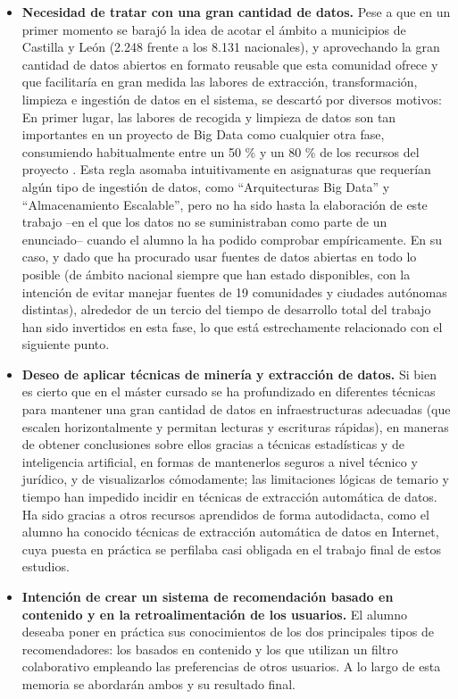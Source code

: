 \begin{itemize}
    \item \textbf{Necesidad de tratar con una gran cantidad de datos.} Pese a que en un primer momento se barajó la idea de acotar el ámbito a municipios de Castilla y León (2.248 frente a los 8.131 nacionales), y aprovechando la gran cantidad de datos abiertos en formato reusable que esta comunidad ofrece y que facilitaría en gran medida las labores de extracción, transformación, limpieza e ingestión de datos en el sistema, se descartó por diversos motivos: En primer lugar, las labores de recogida y limpieza de datos son tan importantes en un proyecto de Big Data como cualquier otra fase, consumiendo habitualmente entre un 50 \% y un 80 \% de los recursos del proyecto \cite{data_prep}. Esta regla asomaba intuitivamente en asignaturas que requerían algún tipo de ingestión de datos, como ``Arquitecturas Big Data'' y ``Almacenamiento Escalable'', pero no ha sido hasta la elaboración de este trabajo –en el que los datos no se suministraban como parte de un enunciado– cuando el alumno la ha podido comprobar empíricamente. En su caso, y dado que ha procurado usar fuentes de datos abiertas en todo lo posible (de ámbito nacional siempre que han estado disponibles, con la intención de evitar manejar fuentes de 19 comunidades y ciudades autónomas distintas), alrededor de un tercio del tiempo de desarrollo total del trabajo han sido invertidos en esta fase, lo que está estrechamente relacionado con el siguiente punto.
    \item \textbf{Deseo de aplicar técnicas de minería y extracción de datos.} Si bien es cierto que en el máster cursado se ha profundizado en diferentes técnicas para mantener una gran cantidad de datos en infraestructuras adecuadas (que escalen horizontalmente y permitan lecturas y escrituras rápidas), en maneras de obtener conclusiones sobre ellos gracias a técnicas estadísticas y de inteligencia artificial, en formas de mantenerlos seguros a nivel técnico y jurídico, y de visualizarlos cómodamente; las limitaciones lógicas de temario y tiempo han impedido incidir en técnicas de extracción automática de datos. Ha sido gracias a otros recursos aprendidos de forma autodidacta, como el alumno ha conocido técnicas de extracción automática de datos en Internet, cuya puesta en práctica se perfilaba casi obligada en el trabajo final de estos estudios.
    \item \textbf{Intención de crear un sistema de recomendación basado en contenido y en la retroalimentación de los usuarios.} El alumno deseaba poner en práctica sus conocimientos de los dos principales tipos de recomendadores: los basados en contenido y los que utilizan un filtro colaborativo empleando las preferencias de otros usuarios. A lo largo de esta memoria se abordarán ambos y su resultado final.

\end{itemize}
